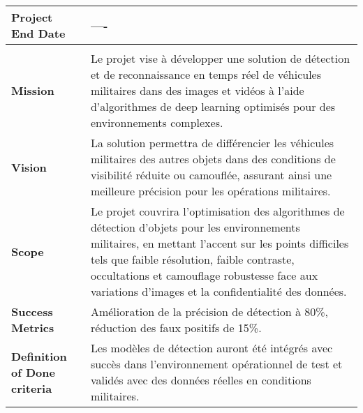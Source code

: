 \begin{table}[h]
\begin{tabular}{|p{4cm}|p{12.5cm}|}
        \hline
        \textbf{Project End Date}                    & ----                                                                                                                                                                                                                                                                                                          \\
        \hline
        \rowcolor{gray}\multicolumn{2}{|c|}{\textbf{Project Details}}                                                                                                                                                                                                                                                                                                \\
        \hline
        \textbf{Mission}                             & Le projet vise à développer une solution de détection et de reconnaissance en temps réel de véhicules militaires dans des images et vidéos à l'aide d'algorithmes de deep learning optimisés pour des environnements complexes.                                                                               \\
        \hline
        \textbf{Vision}                              & La solution permettra de différencier les véhicules militaires des autres objets dans des conditions de visibilité réduite ou camouflée, assurant ainsi une meilleure précision pour les opérations militaires.                                                                                               \\
        \hline
        \textbf{Scope}                               & Le projet couvrira l'optimisation des algorithmes de détection d'objets pour les environnements militaires, en mettant l'accent sur les points difficiles tels que faible résolution, faible contraste, occultations et camouflage robustesse face aux variations d'images et la confidentialité des données. \\
        \hline
        \textbf{Success Metrics}                     & Amélioration de la précision de détection à 80\%, réduction des faux positifs de 15\%.                                                                                                                                                                                                                        \\
        \hline
        \textbf{Definition of Done criteria}         & Les modèles de détection auront été intégrés avec succès dans l'environnement opérationnel de test et validés avec des données réelles en conditions militaires.                                                                                                                                              \\

\end{tabular}
\end{table}
